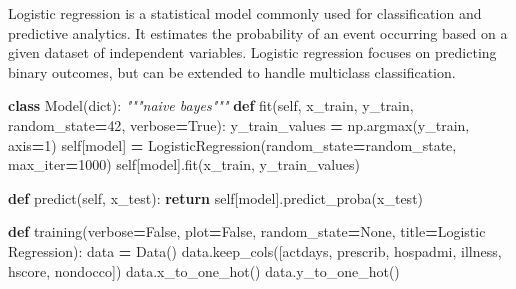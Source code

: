 \documentclass[
]{article}
\newenvironment{Shaded}{\begin{snugshade}}{\end{snugshade}}
\newcommand{\BuiltInTok}[1]{#1}
\newcommand{\CommentTok}[1]{\textcolor[rgb]{0.56,0.35,0.01}{\textit{#1}}}
\newcommand{\ControlFlowTok}[1]{\textcolor[rgb]{0.13,0.29,0.53}{\textbf{#1}}}
\newcommand{\DecValTok}[1]{\textcolor[rgb]{0.00,0.00,0.81}{#1}}
\newcommand{\KeywordTok}[1]{\textcolor[rgb]{0.13,0.29,0.53}{\textbf{#1}}}
\newcommand{\NormalTok}[1]{#1}
\newcommand{\OperatorTok}[1]{\textcolor[rgb]{0.81,0.36,0.00}{\textbf{#1}}}
\newcommand{\StringTok}[1]{\textcolor[rgb]{0.31,0.60,0.02}{#1}}
\newcommand{\VariableTok}[1]{\textcolor[rgb]{0.00,0.00,0.00}{#1}}
\begin{document}
Logistic regression is a statistical model commonly used for
classification and predictive analytics. It estimates the probability of
an event occurring based on a given dataset of independent variables.
Logistic regression focuses on predicting binary outcomes, but can be
extended to handle multiclass classification.

\begin{Shaded}
\begin{Highlighting}[]

\KeywordTok{class}\NormalTok{ Model(}\BuiltInTok{dict}\NormalTok{):}
    \CommentTok{"""naive bayes"""}
    \KeywordTok{def}\NormalTok{ fit(}\VariableTok{self}\NormalTok{, x\_train, y\_train, random\_state}\OperatorTok{=}\DecValTok{42}\NormalTok{, verbose}\OperatorTok{=}\VariableTok{True}\NormalTok{):}
\NormalTok{        y\_train\_values }\OperatorTok{=}\NormalTok{ np.argmax(y\_train, axis}\OperatorTok{=}\DecValTok{1}\NormalTok{)}
        \VariableTok{self}\NormalTok{[}\StringTok{\textquotesingle{}model\textquotesingle{}}\NormalTok{] }\OperatorTok{=}\NormalTok{ LogisticRegression(random\_state}\OperatorTok{=}\NormalTok{random\_state, max\_iter}\OperatorTok{=}\DecValTok{1000}\NormalTok{)}
        \VariableTok{self}\NormalTok{[}\StringTok{\textquotesingle{}model\textquotesingle{}}\NormalTok{].fit(x\_train, y\_train\_values)}

    \KeywordTok{def}\NormalTok{ predict(}\VariableTok{self}\NormalTok{, x\_test):}
        \ControlFlowTok{return} \VariableTok{self}\NormalTok{[}\StringTok{\textquotesingle{}model\textquotesingle{}}\NormalTok{].predict\_proba(x\_test)}


\KeywordTok{def}\NormalTok{ training(verbose}\OperatorTok{=}\VariableTok{False}\NormalTok{, plot}\OperatorTok{=}\VariableTok{False}\NormalTok{, random\_state}\OperatorTok{=}\VariableTok{None}\NormalTok{, title}\OperatorTok{=}\StringTok{\textquotesingle{}Logistic Regression\textquotesingle{}}\NormalTok{):}
\NormalTok{    data }\OperatorTok{=}\NormalTok{ Data()}
\NormalTok{    data.keep\_cols([}\StringTok{\textquotesingle{}actdays\textquotesingle{}}\NormalTok{, }\StringTok{\textquotesingle{}prescrib\textquotesingle{}}\NormalTok{, }\StringTok{\textquotesingle{}hospadmi\textquotesingle{}}\NormalTok{, }\StringTok{\textquotesingle{}illness\textquotesingle{}}\NormalTok{, }\StringTok{\textquotesingle{}hscore\textquotesingle{}}\NormalTok{, }\StringTok{\textquotesingle{}nondocco\textquotesingle{}}\NormalTok{])}
\NormalTok{    data.x\_to\_one\_hot()}
\NormalTok{    data.y\_to\_one\_hot()}


\end{Highlighting}
\end{Shaded}
\end{document}
